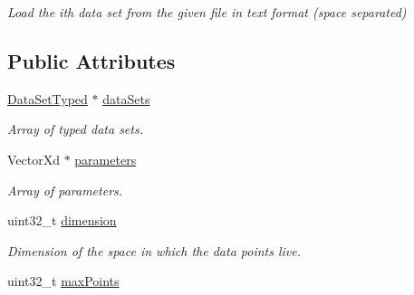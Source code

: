 \begin{DoxyCompactItemize}
\begin{DoxyCompactList}\small\item\em Load the ith data set from the given file in text format (space separated) \end{DoxyCompactList}\end{DoxyCompactItemize}
\subsection*{Public Attributes}
\begin{DoxyCompactItemize}
\item 
\hypertarget{struct_d_r_d_s_p_1_1_data_system_typed_a19267fafd70c07c177b9992468704504}{\hyperlink{struct_d_r_d_s_p_1_1_data_set_typed}{Data\-Set\-Typed} $\ast$ \hyperlink{struct_d_r_d_s_p_1_1_data_system_typed_a19267fafd70c07c177b9992468704504}{data\-Sets}}\label{struct_d_r_d_s_p_1_1_data_system_typed_a19267fafd70c07c177b9992468704504}

\begin{DoxyCompactList}\small\item\em Array of typed data sets. \end{DoxyCompactList}\item 
\hypertarget{struct_d_r_d_s_p_1_1_data_system_typed_a14e96a1e32444f7a799e3d5552317aa5}{Vector\-Xd $\ast$ \hyperlink{struct_d_r_d_s_p_1_1_data_system_typed_a14e96a1e32444f7a799e3d5552317aa5}{parameters}}\label{struct_d_r_d_s_p_1_1_data_system_typed_a14e96a1e32444f7a799e3d5552317aa5}

\begin{DoxyCompactList}\small\item\em Array of parameters. \end{DoxyCompactList}\item 
\hypertarget{struct_d_r_d_s_p_1_1_data_system_typed_a2b4eaddeb36714703850fdb92050ca0a}{uint32\-\_\-t \hyperlink{struct_d_r_d_s_p_1_1_data_system_typed_a2b4eaddeb36714703850fdb92050ca0a}{dimension}}\label{struct_d_r_d_s_p_1_1_data_system_typed_a2b4eaddeb36714703850fdb92050ca0a}

\begin{DoxyCompactList}\small\item\em Dimension of the space in which the data points live. \end{DoxyCompactList}\item 
\hypertarget{struct_d_r_d_s_p_1_1_data_system_typed_a02ab7e32e3df6e667e176144520c339c}{uint32\-\_\-t \hyperlink{struct_d_r_d_s_p_1_1_data_system_typed_a02ab7e32e3df6e667e176144520c339c}{max\-Points}}\label{struct_d_r_d_s_p_1_1_data_system_typed_a02ab7e32e3df6e667e176144520c339c}


\end{DoxyCompactItemize}
